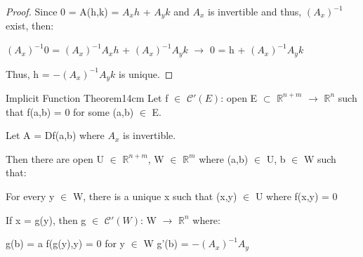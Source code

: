     \begin{proof}
        Since 0 = A(h,k) = $A_xh$ + $A_yk$ and $A_x$ is invertible
        and thus, $(A_x)^{-1}$ exist, then:
        
        \hspace{0.5cm}
        $(A_x)^{-1}$0 = $(A_x)^{-1}A_xh$ + $(A_x)^{-1}A_yk$
        \hspace{0.5cm}
        $\rightarrow$
        \hspace{0.5cm}
        0 = h + $(A_x)^{-1}A_yk$

        Thus, h = $-(A_x)^{-1}A_yk$ is unique.
    \end{proof}

    \vspace{0.5cm}




    \begin{wtheorem}{Implicit Function Theorem}{14cm}
        Let f $\in$ $\mathscr{C}'(E)$: open E $\subset$ $\mathbb{R}^{n+m}$
        $\rightarrow$ $\mathbb{R}^n$ such that f(a,b) = 0
        for some (a,b) $\in$ E.

        Let A = Df(a,b) where $A_x$ is invertible.
        
        Then there are open U $\in$ $\mathbb{R}^{n+m}$, W $\in$ $\mathbb{R}^m$
        where (a,b) $\in$ U, b $\in$ W such that:

        \hspace{0.5cm}
        For every y $\in$ W, there is a unique x such that (x,y) $\in$ U
        where f(x,y) = 0

        If x = g(y), then g $\in$ $\mathscr{C}'(W)$: W
        $\rightarrow$ $\mathbb{R}^n$ where:
        
        \hspace{0.5cm}
        g(b) = a
        \hspace{1cm}
        f(g(y),y) = 0 for y $\in$ W
        \hspace{1cm}
        g'(b) = $-(A_x)^{-1}A_y$
    \end{wtheorem}


